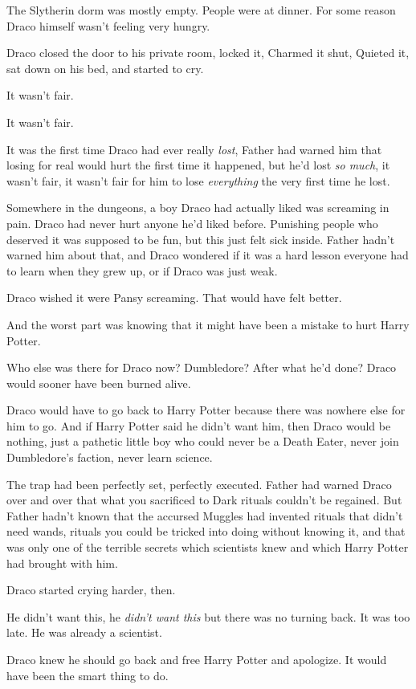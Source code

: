 The Slytherin dorm was mostly empty. People were at dinner. For some reason Draco himself wasn't feeling very hungry.

Draco closed the door to his private room, locked it, Charmed it shut, Quieted it, sat down on his bed, and started to cry.

It wasn't fair.

It wasn't fair.

It was the first time Draco had ever really \emph{lost}, Father had warned him that losing for real would hurt the first time it happened, but he'd lost \emph{so much}, it wasn't fair, it wasn't fair for him to lose \emph{everything} the very first time he lost.

Somewhere in the dungeons, a boy Draco had actually liked was screaming in pain. Draco had never hurt anyone he'd liked before. Punishing people who deserved it was supposed to be fun, but this just felt sick inside. Father hadn't warned him about that, and Draco wondered if it was a hard lesson everyone had to learn when they grew up, or if Draco was just weak.

Draco wished it were Pansy screaming. That would have felt better.

And the worst part was knowing that it might have been a mistake to hurt Harry Potter.

Who else was there for Draco now? Dumbledore? After what he'd done? Draco would sooner have been burned alive.

Draco would have to go back to Harry Potter because there was nowhere else for him to go. And if Harry Potter said he didn't want him, then Draco would be nothing, just a pathetic little boy who could never be a Death Eater, never join Dumbledore's faction, never learn science.

The trap had been perfectly set, perfectly executed. Father had warned Draco over and over that what you sacrificed to Dark rituals couldn't be regained. But Father hadn't known that the accursed Muggles had invented rituals that didn't need wands, rituals you could be tricked into doing without knowing it, and that was only one of the terrible secrets which scientists knew and which Harry Potter had brought with him.

Draco started crying harder, then.

He didn't want this, he \emph{didn't want this} but there was no turning back. It was too late. He was already a scientist.

Draco knew he should go back and free Harry Potter and apologize. It would have been the smart thing to do.

